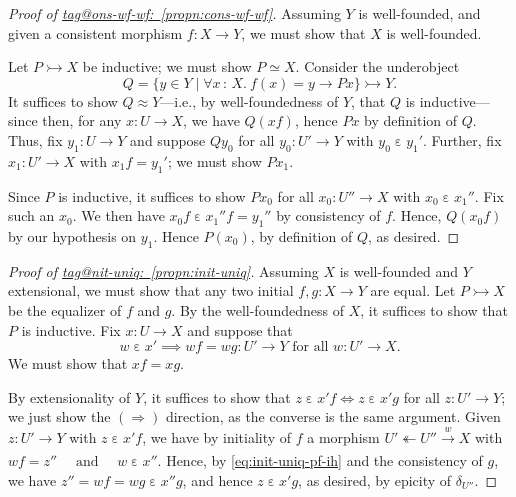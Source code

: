 \documentclass{amsart}
\makeatletter
\newcommand\AND{\text{ and }}
\newcommand\ein{\mathrel{\varepsilon}}
\newcommand\FORALL{\text{ for all }}
\newcommand\oot{\twoheadleftarrow}
\newcommand\set[2][]{#1\{ #2 #1\}}
\newcommand\tolon{{\,:\,}}
\newcommand\ToT{\Leftrightarrow}
\newcommand\tox[2][]{\xrightarrow[#1]{#2}}
\newcommand\To{\Rightarrow}
\newcommand\tto{\rightarrowtail}
\newcommand\tagword[1]{\csname tag@#1\endcsname}
\def\label@tag#1:#2\@nil{#1}
\newcommand\labeltag[1]{\label@tag#1:\@nil}
\newcommand\jref[1]{%
  \texorpdfstring%
    {\hyperref[#1]{\tagword{\labeltag{#1}}~\ref*{#1}}}%
    {\tagword{\labeltag{#1}}~\ref*{#1}}%
}
\theoremstyle{definition}
\theoremstyle{remark}
\theoremstyle{plainwithref}
\makeatother
\begin{document}
\begin{proof}[Proof of \jref{propn:cons-wf-wf}] \label{proof:cons-wf-wf}
  Assuming \( Y \) is well-founded, and given a consistent morphism \( f \colon X \to Y \), we must show that \( X \) is well-founded.

  Let \( P \tto X \) be inductive; we must show \( P \simeq X \).
  Consider the underobject
  \[
    Q = \set{ y \in Y \mid \forall x \tolon X.\ f(x) = y \to P x } \tto Y.
  \]
  It suffices to show \( Q \approx Y \)---i.e., by well-foundedness of \( Y \), that \( Q \) is inductive---since then, for any \( x \colon U \to X \), we have \( Q(x f) \), hence \( P x \) by definition of \( Q \).
  Thus, fix \( y_1 \colon U \to Y \) and suppose \( Q y_0 \) for all \( y_0 \colon U' \to Y \) with \( y_0 \ein y_1' \).
  Further, fix \( x_1 \colon U' \to X \) with \( x_1 f = y_1' \); we must show \( P x_1 \).

  Since \( P \) is inductive, it suffices to show \( P x_0 \) for all \( x_0 \colon U'' \to X \) with \( x_0 \ein x_1'' \).
  Fix such an \( x_0 \).
  We then have \( x_0 f \ein x_1'' f = y_1'' \) by consistency of \( f \).
  Hence, \( Q(x_0 f) \) by our hypothesis on \( y_1 \).
  Hence \( P(x_0) \), by definition of \( Q \), as desired.
\end{proof}

\begin{proof}[Proof of \jref{propn:init-uniq}] \label{proof:init-uniq}
  Assuming \( X \) is well-founded and \( Y \) extensional, we must show that any two initial \( f,g \colon X \to Y \) are equal.
  Let \( P \tto X \) be the equalizer of \( f \) and \( g \).
  By the well-foundedness of \( X \), it suffices to show that \( P \) is inductive.
  Fix \( x \colon U \to X \) and suppose that
  \begin{equation} \label{eq:init-uniq-pf-ih}
    w \ein x'
    \implies
    w f = w g \colon U' \to Y
    \FORALL
    w \colon U' \to X.
  \end{equation}
  We must show that \( x f = x g \).

  By extensionality of \( Y \), it suffices to show that
  \( z \ein x' f \ToT z \ein x' g \) for all \( z \colon U' \to Y \); we just show the \( (\To) \) direction, as the converse is the same argument.
  Given \( z \colon U' \to Y \) with \( z \ein x' f \), we have by initiality of \( f \) a morphism \( U' \oot U'' \tox{w} X \) with
  \( w f = z'' \quad \AND \quad w \ein x'' \).
  Hence, by \eqref{eq:init-uniq-pf-ih} and the consistency of \( g \), we have \( z'' = w f = w g \ein x'' g \), and hence \( z \ein x' g \), as desired, by epicity of \( \delta_{U''} \).
\end{proof}
\end{document}
